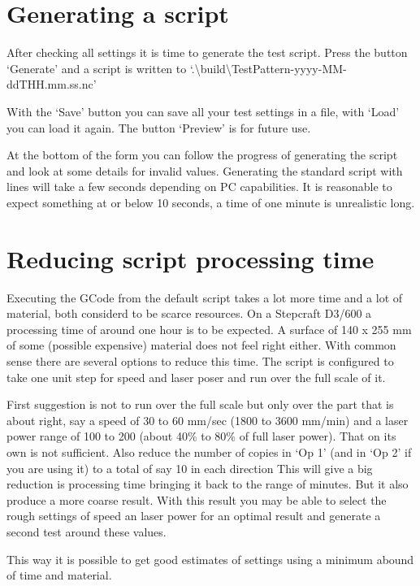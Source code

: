 \section{Generating a script}
After checking all settings it is time to generate the test script. Press the button `Generate' and a script is written to `.\textbackslash{}build\textbackslash{}TestPattern-yyyy-MM-ddTHH.mm.ss.nc'

With the `Save' button you can save all your test settings in a file, with `Load' you can load it again. The button `Preview' is for future use.

At the bottom of the form you can follow the progress of generating the script and look at some details for invalid values. Generating the standard script with lines will take a few seconds
depending on PC capabilities. It is reasonable to expect something at or below 10 seconds, a time of one minute is unrealistic long.

\section{Reducing script processing time}
Executing the GCode from the default script takes a lot more time and a lot of material, both considerd to be scarce resources. On a Stepcraft D3/600 a processing time of around one hour is
to be expected. A surface of 140 x 255 mm of some (possible expensive) material does not feel right either. With common sense there are several options to reduce this time. The script is
configured to take one unit step for speed and laser poser and run over the full scale of it.

First suggestion is not to run over the full scale but only over the part that is about right, say a speed of 30 to 60 mm/sec  (1800 to 3600 mm/min) and a laser power range of 100 to 200
(about 40\% to 80\% of full laser power). That on its own is not sufficient. Also reduce the number of copies in `Op 1' (and in `Op 2' if you are using it) to a total of say 10 in each direction
This will give a big reduction is processing time bringing it back to the range of minutes. But it also produce a more coarse result. With this result you may be able to select the rough settings
of speed an laser power for an optimal result and generate a second test around these values.

This way it is possible to get good estimates of settings using a minimum abound of time and material.
